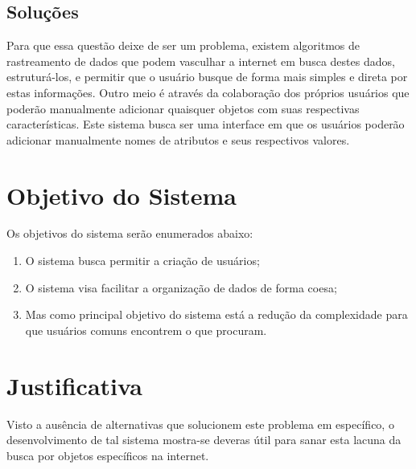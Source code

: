     \subsection{Soluções}

        Para que essa questão deixe de ser um problema, existem algoritmos de rastreamento de dados que podem vasculhar a internet em busca destes dados, estruturá-los, e permitir que o usuário busque de forma mais simples e direta por estas informações. Outro meio é através da colaboração dos próprios usuários que poderão manualmente adicionar quaisquer objetos com suas respectivas características. Este sistema busca ser uma interface em que os usuários poderão adicionar manualmente nomes de atributos e seus respectivos valores.

\section{Objetivo do Sistema} %

    Os objetivos do sistema serão enumerados abaixo:
    
    \begin{enumerate}
        \item O sistema busca permitir a criação de usuários;
        \item O sistema visa facilitar a organização de dados de forma coesa;
        \item Mas como principal objetivo do sistema está a redução da complexidade para que usuários comuns encontrem o que procuram.
    \end{enumerate}

\section{Justificativa} %

    Visto a ausência de alternativas que solucionem este problema em específico, o desenvolvimento de tal sistema mostra-se deveras útil para sanar esta lacuna da busca por objetos específicos na internet.

\begin{comment}
    Prof. Dr. Ausberto S. Castro Vera
    UENF - CCT - LCMAT - Curso de Ciência da Computação
    Campos, RJ, 2022
    Disciplina: Paradigma de Desenvolvimento Orientado a Objetos
    Aluno: João Vítor Fernandes Dias
\end{comment}